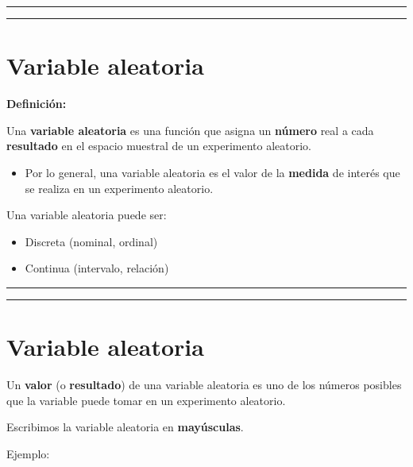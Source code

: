 \documentclass[
]{book}
\providecommand{\tightlist}{%
  \setlength{\itemsep}{0pt}\setlength{\parskip}{0pt}}
\begin{document}
\begin{center}\rule{0.5\linewidth}{0.5pt}\end{center}

\begin{center}\rule{0.5\linewidth}{0.5pt}\end{center}

\hypertarget{variable-aleatoria}{%
\section{Variable aleatoria}\label{variable-aleatoria}}

\textbf{Definición:}

Una \textbf{variable aleatoria} es una función que asigna un \textbf{número} real a cada \textbf{resultado} en el espacio muestral de un experimento aleatorio.

\begin{itemize}
\tightlist
\item
  Por lo general, una variable aleatoria es el valor de la \textbf{medida} de interés que se realiza en un experimento aleatorio.
\end{itemize}

Una variable aleatoria puede ser:

\begin{itemize}
\tightlist
\item
  Discreta (nominal, ordinal)
\item
  Continua (intervalo, relación)
\end{itemize}

\begin{center}\rule{0.5\linewidth}{0.5pt}\end{center}

\begin{center}\rule{0.5\linewidth}{0.5pt}\end{center}

\hypertarget{variable-aleatoria-1}{%
\section{Variable aleatoria}\label{variable-aleatoria-1}}

Un \textbf{valor} (o \textbf{resultado}) de una variable aleatoria es uno de los números posibles que la variable puede tomar en un experimento aleatorio.

Escribimos la variable aleatoria en \textbf{mayúsculas}.

Ejemplo:
\end{document}
